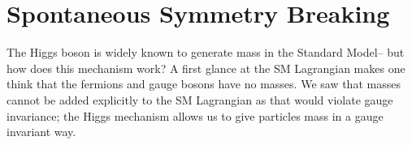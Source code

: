 \documentclass[11pt, oneside]{article}   	%
\theoremstyle{definition}
\numberwithin{equation}{subsection}		%
\begin{document}

\newpage
\section{Spontaneous Symmetry Breaking}

The Higgs boson is widely known to generate mass in the Standard Model-- but how does this mechanism work? A first glance at 
the SM Lagrangian makes one think that the fermions and gauge bosons have no masses. We saw that 
masses cannot be added explicitly to the SM Lagrangian as that would violate gauge invariance; the Higgs mechanism allows 
us to give particles mass in a gauge invariant way.
\end{document}
